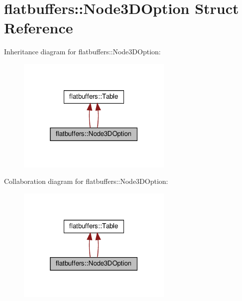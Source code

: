 \hypertarget{structflatbuffers_1_1Node3DOption}{}\section{flatbuffers\+:\+:Node3\+D\+Option Struct Reference}
\label{structflatbuffers_1_1Node3DOption}


Inheritance diagram for flatbuffers\+:\+:Node3\+D\+Option\+:
\nopagebreak
\begin{figure}[H]
\begin{center}
\leavevmode
\includegraphics[width=211pt]{structflatbuffers_1_1Node3DOption__inherit__graph}
\end{center}
\end{figure}


Collaboration diagram for flatbuffers\+:\+:Node3\+D\+Option\+:
\nopagebreak
\begin{figure}[H]
\begin{center}
\leavevmode
\includegraphics[width=211pt]{structflatbuffers_1_1Node3DOption__coll__graph}
\end{center}
\end{figure}
